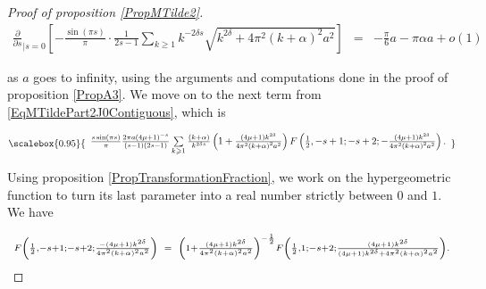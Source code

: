\documentclass{jams-l}
\theoremstyle{definition}
\theoremstyle{remark}
\numberwithin{equation}{section}
\newcommand\scalemath[2]{\scalebox{#1}{\mbox{\ensuremath{\displaystyle #2}}}}
\begin{document}
\begin{proof}[Proof of proposition \ref{PropMTilde2}]
                        \[ \begin{array}{lll}
                                \scriptstyle \frac{\partial}{\partial s}_{\left \vert s = 0 \right.} \left[ - \frac{\sin \left( \pi s \right)}{\pi} \cdot \frac{1}{2s-1} \sum\limits_{k \geqslant 1} k^{-2 \delta s} \sqrt{k^{2 \delta} + 4 \pi^2 \left( k + \alpha \right)^2 a^2} \right] & \scriptstyle = & \scriptstyle - \frac{\pi}{6} a - \pi \alpha a + o \left( 1 \right)
                            \end{array} \]
                        
                        \noindent as $a$ goes to infinity, using the arguments and computations done in the proof of proposition \ref{PropA3}. We move on to the next term from \eqref{EqMTildePart2J0Contiguous}, which is
                        
                        \[ \scalemath{0.95}{\begin{array}{c}
                                \frac{s \sin \left( \pi s \right)}{\pi} \frac{2 \pi a \left( 4 \mu + 1 \right)^{-s}}{\left( s-1 \right) \left( 2s-1 \right)} \sum\limits_{k \geqslant 1} \frac{\left( k + \alpha \right)}{k^{2 \delta s}} \left( 1 + \frac{\left( 4 \mu + 1 \right) k^{2 \delta}}{4 \pi^2 \left( k + \alpha \right)^2 a^2} \right) F \left( \frac{1}{2}, -s+1; -s+2; - \frac{\left( 4 \mu + 1 \right) k^{2 \delta}}{4 \pi^2 \left( k + \alpha \right)^2 a^2} \right).
                            \end{array}} \]
                        
                        \noindent Using proposition \ref{PropTransformationFraction}, we work on the hypergeometric function to turn its last parameter into a real number strictly between $0$ and $1$. We have
                        
                        \[ \begin{array}{lll}
                                \scriptstyle F \left( \frac{1}{2}, -s+1; -s+2; \frac{- \left( 4 \mu + 1 \right) k^{2 \delta}}{4 \pi^2 \left( k + \alpha \right)^2 a^2} \right) & \hspace{-5pt} \scriptstyle = \hspace{-5pt} & \scriptstyle \left( 1 + \frac{\left( 4 \mu + 1 \right) k^{2 \delta}}{4 \pi^2 \left( k + \alpha \right)^2 a^2} \right)^{-\frac{1}{2}} F \left( \frac{1}{2}, 1; -s+2; \frac{\left( 4 \mu + 1 \right) k^{2 \delta}}{\left( 4 \mu + 1 \right) k^{2 \delta} + 4 \pi^2 \left( k + \alpha \right)^2 a^2} \right).
                            \end{array} \]
                        

\end{proof}
\end{document}
